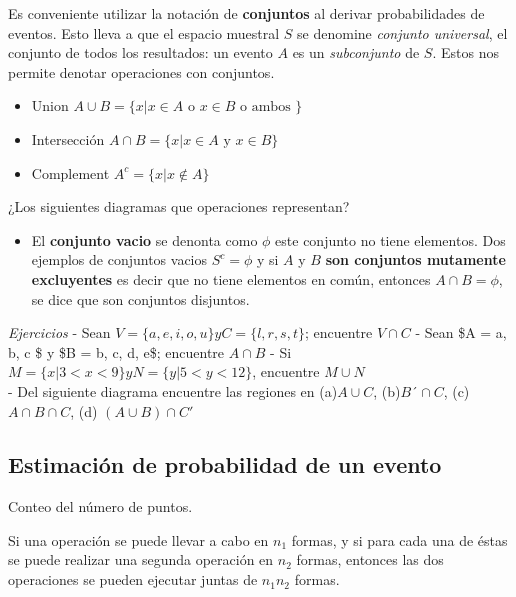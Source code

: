 \documentclass[11pt]{article}
\providecommand{\tightlist}{%
      \setlength{\itemsep}{0pt}\setlength{\parskip}{0pt}}
\begin{document}
Es conveniente utilizar la notación de \textbf{conjuntos} al derivar
probabilidades de eventos. Esto lleva a que el espacio muestral \(S\) se
denomine \emph{conjunto universal}, el conjunto de todos los resultados:
un evento \(A\) es un \emph{subconjunto} de \(S\). Estos nos permite
denotar operaciones con conjuntos.

\begin{itemize}
\item
  Union
  \(A \cup B = \lbrace x\vert x \in A \text{ o } x \in B \text{ o ambos }\rbrace\)
\item
  Intersección
  \(A \cap B = \lbrace x\vert x \in A \text{ y } x \in B \rbrace\)
\item
  Complement \(A^{c}= \lbrace x \vert x \notin A \rbrace\)
\end{itemize}

¿Los siguientes diagramas que operaciones representan?

\begin{itemize}
\tightlist
\item
  El \textbf{conjunto vacio} se denonta como \(\phi\) este conjunto no
  tiene elementos. Dos ejemplos de conjuntos vacios \(S^{c}=\phi\) y si
  \(A\) y \(B\) \textbf{son conjuntos mutamente excluyentes} es decir
  que no tiene elementos en común, entonces \(A \cap B= \phi\), se dice
  que son conjuntos disjuntos.
\end{itemize}

\emph{Ejercicios} - Sean
\(V = \lbrace a , e, i, o, u \rbrace y C = \lbrace l, r, s, t\rbrace\);
encuentre \(V \cap C\) - Sean \$A = \lbrace a, b, c \rbrace \$ y \$B =
\lbrace b, c, d, e\rbrace \$; encuentre \(A \cap B\) - Si
\(M = \lbrace x \vert 3 < x < 9 \rbrace y N = \lbrace y \vert 5 < y < 12\rbrace\),
encuentre \(M \cup N\)\\
- Del siguiente diagrama encuentre las regiones en (a)\(A \cup C\),
(b)\(B´ \cap C\), (c)\(A\cap B \cap C\), (d) \((A \cup B) \cap C'\)

    \hypertarget{estimaciuxf3n-de-probabilidad-de-un-evento}{%
\subsection{Estimación de probabilidad de un
evento}\label{estimaciuxf3n-de-probabilidad-de-un-evento}}

Conteo del número de puntos.

Si una operación se puede llevar a cabo en \(n_{1}\) formas, y si para
cada una de éstas se puede realizar una segunda operación en \(n_{2}\)
formas, entonces las dos operaciones se pueden ejecutar juntas de
\(n_{1}n_{2}\) formas.
\end{document}
